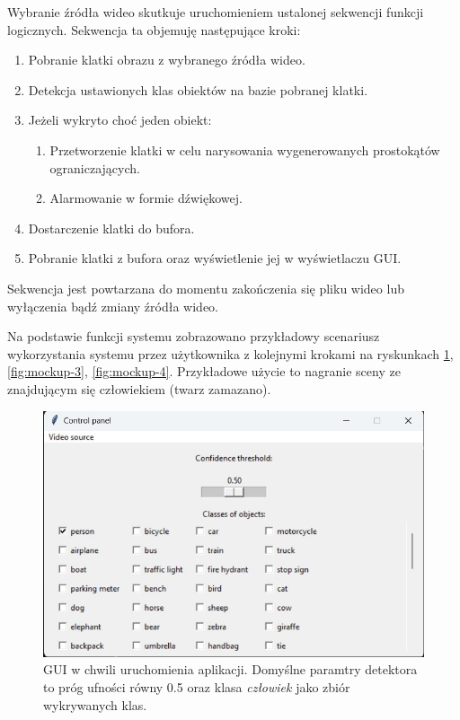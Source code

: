 Wybranie źródła wideo skutkuje uruchomieniem ustalonej sekwencji funkcji logicznych. Sekwencja ta objemuję następujące kroki:
\begin{enumerate}
    \item Pobranie klatki obrazu z wybranego źródła wideo.
    \item Detekcja ustawionych klas obiektów na bazie pobranej klatki.
    \item Jeżeli wykryto choć jeden obiekt:
    \begin{enumerate}
        \item Przetworzenie klatki w celu narysowania wygenerowanych prostokątów ograniczających. 
        \item Alarmowanie w formie dźwiękowej. 
    \end{enumerate}
    \item Dostarczenie klatki do bufora.
    \item Pobranie klatki z bufora oraz wyświetlenie jej w wyświetlaczu GUI.
\end{enumerate} 
Sekwencja jest powtarzana do momentu zakończenia się pliku wideo lub wyłączenia bądź zmiany źródła wideo. 

Na podstawie funkcji systemu zobrazowano przykładowy scenariusz wykorzystania systemu przez użytkownika z kolejnymi krokami na ryskunkach \ref{fig:mockup-2}, \ref{fig:mockup-3}, \ref{fig:mockup-4}. Przykładowe użycie to nagranie sceny ze znajdującym się człowiekiem (twarz zamazano).

\begin{figure}[H]
    \centering
    \includegraphics[width=\linewidth]{r_implementacja/panel_sterowania/panel_mockup.jpg}
    \caption{GUI w chwili uruchomienia aplikacji. Domyślne paramtry detektora to próg ufności równy 0.5 oraz klasa \emph{człowiek} jako zbiór wykrywanych klas.}
    \label{fig:mockup-2}
\end{figure}

